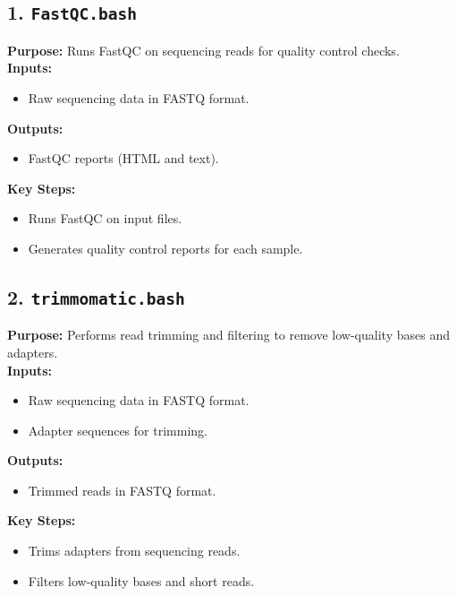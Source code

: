 \documentclass[11pt]{article}
\begin{document}
\subsection*{1. \texttt{FastQC.bash}}
\textbf{Purpose:} Runs FastQC on sequencing reads for quality control checks. \\
\textbf{Inputs:}
\begin{itemize}
	\item Raw sequencing data in FASTQ format.
\end{itemize}
\textbf{Outputs:}
\begin{itemize}
	\item FastQC reports (HTML and text).
\end{itemize}
\textbf{Key Steps:}
\begin{itemize}
	\item Runs FastQC on input files.
	\item Generates quality control reports for each sample.
\end{itemize}

\subsection*{2. \texttt{trimmomatic.bash}}
\textbf{Purpose:} Performs read trimming and filtering to remove low-quality bases and adapters. \\
\textbf{Inputs:}
\begin{itemize}
	\item Raw sequencing data in FASTQ format.
	\item Adapter sequences for trimming.
\end{itemize}
\textbf{Outputs:}
\begin{itemize}
	\item Trimmed reads in FASTQ format.
\end{itemize}
\textbf{Key Steps:}
\begin{itemize}
	\item Trims adapters from sequencing reads.
	\item Filters low-quality bases and short reads.
\end{itemize}
\end{document}
